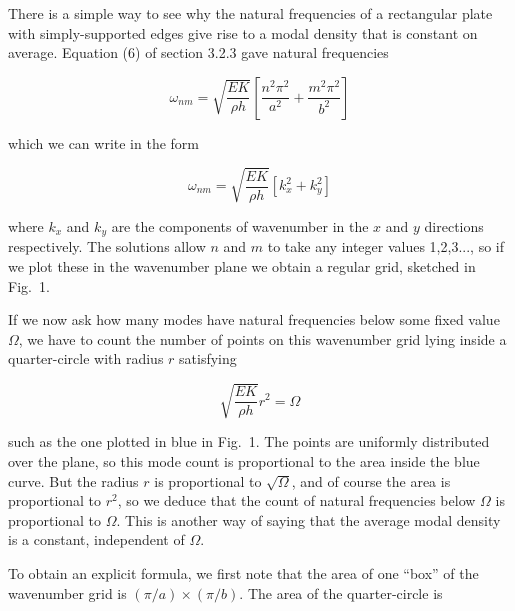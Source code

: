   There is a simple way to see why the natural frequencies of a rectangular 
  plate with simply-supported edges give rise to a modal density that is 
  constant on average. Equation (6) of section 3.2.3 gave natural frequencies 

  \begin{equation*}\omega_{nm} = \sqrt{\frac{EK}{\rho h}} \left[\frac{n^2 
  \pi^2}{a^2}+\frac{m^2 \pi^2}{b^2} \right] \tag{1}\end{equation*} 

  \noindent{}which we can write in the form 

  \begin{equation*}\omega_{nm} = \sqrt{\frac{EK}{\rho h}} \left[k_x^2+k_y^2 
  \right] \tag{2}\end{equation*} 

  \noindent{}where $k_x$ and $k_y$ are the components of wavenumber in the $x$ 
  and $y$ directions respectively. The solutions allow $n$ and $m$ to take any 
  integer values 1,2,3..., so if we plot these in the wavenumber plane we 
  obtain a regular grid, sketched in Fig.\ 1. 


  If we now ask how many modes have natural frequencies below some fixed value 
  $\Omega$, we have to count the number of points on this wavenumber grid lying 
  inside a quarter-circle with radius $r$ satisfying 

  \begin{equation*}\sqrt{\frac{EK}{\rho h}} r^2 = \Omega \tag{3}\end{equation*} 

  \noindent{}such as the one plotted in blue in Fig.\ 1. The points are 
  uniformly distributed over the plane, so this mode count is proportional to 
  the area inside the blue curve. But the radius $r$ is proportional to 
  $\sqrt{\Omega}$, and of course the area is proportional to $r^2$, so we 
  deduce that the count of natural frequencies below $\Omega$ is proportional 
  to $\Omega$. This is another way of saying that the average modal density is 
  a constant, independent of $\Omega$. 

  To obtain an explicit formula, we first note that the area of one ``box'' of 
  the wavenumber grid is $(\pi/a) \times (\pi/b)$. The area of the 
  quarter-circle is 

